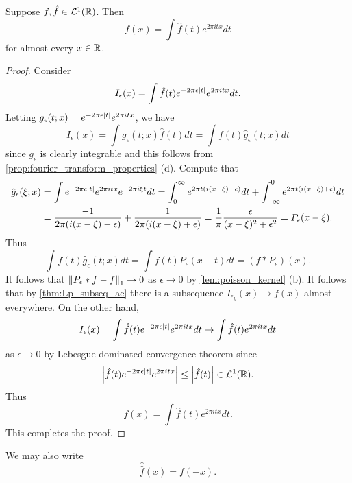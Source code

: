 \begin{theorem}
    Suppose $f,\hat{f}\in\mathcal{L}^1(\mathbb{R})$. Then
    \begin{equation*}
        f(x) = \int \hat{f}(t)e^{2\pi itx}dt
    \end{equation*}
    for almost every $x\in\mathbb{R}$.
\end{theorem}
\begin{proof}
    Consider 
    \begin{equation*}
        I_\epsilon(x) = \int\hat{f}(t)e^{-2\pi\epsilon\left\lvert {t} \right\rvert}e^{2\pi itx}dt.
    \end{equation*}
    Letting $g_\epsilon(t;x) = e^{-2\pi\epsilon\left\lvert {t} \right\rvert}e^{2\pi itx}$, we have 
    \begin{equation*}
        I_\epsilon(x) = \int g_\epsilon(t;x)\hat{f}(t)dt = \int f(t)\hat{g}_\epsilon(t;x)dt
    \end{equation*}
    since $g_\epsilon$ is clearly integrable and this follows from 
    \cref{prop:fourier_transform_properties} (d). Compute that 
    \begin{equation*}
        \begin{split}
            \hat{g}_\epsilon(\xi;x) &= \int e^{-2\pi\epsilon\left\lvert {t} \right\rvert}e^{2\pi itx}e^{-2\pi i\xi t}dt 
            = \int_0^\infty e^{2\pi t(i(x-\xi)-\epsilon)}dt + \int_{-\infty}^0 e^{2\pi t(i(x-\xi)+\epsilon)}dt \\ 
            &= \frac{-1}{2\pi(i(x-\xi)-\epsilon)} + \frac{1}{2\pi(i(x-\xi)+\epsilon)} 
            = \frac{1}{\pi}\frac{\epsilon}{(x-\xi)^2+\epsilon^2} = P_\epsilon(x-\xi).
        \end{split}
    \end{equation*}
    Thus 
    \begin{equation*}
        \int f(t)\hat{g}_\epsilon(t;x)dt = \int f(t)P_\epsilon(x-t)dt = (f*P_\epsilon)(x).
    \end{equation*}
    It follows that $\left\lVert {P_\epsilon*f - f} \right\rVert_1\to 0$ as $\epsilon\to 0$ by
    \cref{lem:poisson_kernel} (b). It follows that by \cref{thm:Lp_subseq_ae} there is 
    a subsequence $I_{\epsilon_k}(x)\to f(x)$ almost everywhere.
    On the other hand, 
    \begin{equation*}
        I_\epsilon(x) = \int \hat{f}(t)e^{-2\pi\epsilon\left\lvert {t} \right\rvert}e^{2\pi itx}dt
        \to \int \hat{f}(t)e^{2\pi itx}dt
    \end{equation*}
    as $\epsilon\to 0$ by Lebesgue dominated convergence theorem since 
    \begin{equation*}
        \left\lvert {\hat{f}(t)e^{-2\pi\epsilon\left\lvert {t} \right\rvert}e^{2\pi itx}} \right\rvert\leq \left\lvert {\hat{f}(t)} \right\rvert\in\mathcal{L}^1(\mathbb{R}).
    \end{equation*}
    Thus 
    \begin{equation*}
        f(x) = \int \hat{f}(t)e^{2\pi itx}dt.
    \end{equation*}
    This completes the proof.
\end{proof}
\begin{remark}
    We may also write 
    \begin{equation*}
        \hat{\hat{f}}(x) = f(-x).
    \end{equation*}
\end{remark}

